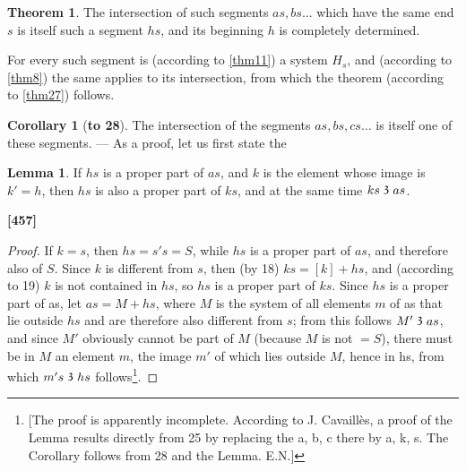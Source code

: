\documentclass[leqno, hidelinks]{article}
\theoremstyle{definition}
\newtheorem{theorem}{Theorem}
\newtheorem*{corollary}{Corollary}
\newtheorem*{lemma}{Lemma}
\newcommand\partof{\mathrel{\raisebox{0.45ex}{$\mathfrak{3}$}}}
\begin{document}
\begin{theorem}\label{thm28}
The intersection of such segments $as, bs\ldots$ which have the same end $s$ is itself such a segment $hs$, and its beginning $h$ is completely determined.
\end{theorem}

For every such segment is (according to \ref{thm11}) a system $H_s$, and (according to \ref{thm8}) the same applies to its intersection, from which the theorem (according to \ref{thm27}) follows.

\begin{corollary}[\textbf{to 28}]
\label{cor_to_thm28}
The intersection of the segments $as, bs, cs \ldots$ is itself one of these segments. --- As a proof, let us first state the
\end{corollary}

\begin{lemma}
If $hs$ is a proper part of $as$, and $k$ is the element whose image is $k'=h$, then $hs$ is also a proper part of $ks$, and at the same time $ks \partof as$.
\end{lemma}
\noindent \textbf{[457]}

\begin{proof}
If $k=s$, then $hs=s's= S$, while $hs$ is a proper part of $as$, and therefore also of $S$. Since $k$ is different from $s$, then (by 18) $ks =[k]+ hs$, and (according to 19) $k$ is not contained in $hs$, so $hs$ is a proper part of $ks$.
Since $hs$ is a proper part of as, let $as = M + hs$, where $M$ is the system of all elements $m$ of as that lie outside $hs$ and are therefore also different from $s$; from this follows $M' \partof as$, and since $M'$ obviously cannot be part of $M$ (because $M$ is not $= S$), there must be in $M$ an element $m$, the image $m'$ of which lies outside $M$, hence in hs, from which $m's \partof hs$ follows\footnote{[The proof is apparently incomplete. According to J. Cavaillès, a proof of the Lemma results directly from 25 by replacing the a, b, c there by a, k, s. The Corollary follows from 28 and the Lemma. E.N.]}.\end{proof}
\end{document}
